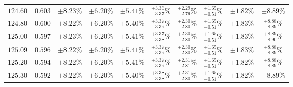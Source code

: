 \begin{table}[ht!]
{{\begin{tabular}{| cc | ccc | cccc | c |}
$124.60$ & $0.603$ & $\pm8.23\%$ & {\color{black!55}$\pm 6.20\%$} & {\color{black!55}$\pm 5.41\%$} & $^{+3.36}_{-3.37}\%$ & {\color{black!55}$^{+2.29}_{-2.79}\%$} & {\color{black!55}$^{+1.65}_{-0.51}\%$} & {\color{black!55}$\pm 1.82\%$} & $\pm8.89\%$  \\
$124.80$ & $0.600$ & $\pm8.22\%$ & {\color{black!55}$\pm 6.20\%$} & {\color{black!55}$\pm 5.40\%$} & $^{+3.37}_{-3.39}\%$ & {\color{black!55}$^{+2.30}_{-2.80}\%$} & {\color{black!55}$^{+1.65}_{-0.51}\%$} & {\color{black!55}$\pm 1.83\%$} & $^{+8.88}_{-8.89}\%$  \\
$125.00$ & $0.597$ & $\pm8.23\%$ & {\color{black!55}$\pm 6.20\%$} & {\color{black!55}$\pm 5.41\%$} & $^{+3.37}_{-3.38}\%$ & {\color{black!55}$^{+2.30}_{-2.80}\%$} & {\color{black!55}$^{+1.65}_{-0.51}\%$} & {\color{black!55}$\pm 1.83\%$} & $^{+8.89}_{-8.90}\%$  \\
$125.09$ & $0.596$ & $\pm8.22\%$ & {\color{black!55}$\pm 6.20\%$} & {\color{black!55}$\pm 5.41\%$} & $^{+3.37}_{-3.39}\%$ & {\color{black!55}$^{+2.30}_{-2.80}\%$} & {\color{black!55}$^{+1.65}_{-0.51}\%$} & {\color{black!55}$\pm 1.83\%$} & $^{+8.88}_{-8.89}\%$  \\
$125.20$ & $0.594$ & $\pm8.22\%$ & {\color{black!55}$\pm 6.20\%$} & {\color{black!55}$\pm 5.41\%$} & $^{+3.37}_{-3.39}\%$ & {\color{black!55}$^{+2.31}_{-2.81}\%$} & {\color{black!55}$^{+1.65}_{-0.51}\%$} & {\color{black!55}$\pm 1.82\%$} & $^{+8.88}_{-8.89}\%$  \\
$125.30$ & $0.592$ & $\pm8.22\%$ & {\color{black!55}$\pm 6.20\%$} & {\color{black!55}$\pm 5.40\%$} & $^{+3.38}_{-3.38}\%$ & {\color{black!55}$^{+2.31}_{-2.80}\%$} & {\color{black!55}$^{+1.65}_{-0.51}\%$} & {\color{black!55}$\pm 1.82\%$} & $\pm8.89\%$  \\

\end{tabular}}}
\end{table}
